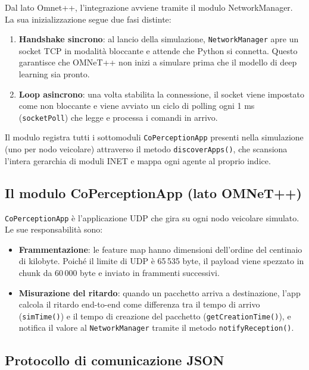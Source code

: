 \documentclass[12pt,a4paper]{article}
\begin{document}
Dal lato Omnet++, l'integrazione avviene tramite il modulo NetworkManager. La sua inizializzazione
segue due fasi distinte:

\begin{enumerate}
  \item \textbf{Handshake sincrono}: al lancio della simulazione, \texttt{NetworkManager} apre
        un socket TCP in modalit\`a bloccante e attende che Python si connetta. Questo garantisce
        che OMNeT++ non inizi a simulare prima che il modello di deep learning sia pronto.

  \item \textbf{Loop asincrono}: una volta stabilita la connessione, il socket viene impostato
        come non bloccante e viene avviato un ciclo di polling ogni 1 ms (\texttt{socketPoll})
        che legge e processa i comandi in arrivo.
\end{enumerate}

Il modulo registra tutti i sottomoduli \texttt{CoPerceptionApp} presenti nella simulazione
(uno per nodo veicolare) attraverso il metodo \texttt{discoverApps()}, che scansiona l'intera
gerarchia di moduli INET e mappa ogni agente al proprio indice.

\subsection{Il modulo CoPerceptionApp (lato OMNeT++)}

\texttt{CoPerceptionApp} \`e l'applicazione UDP che gira su ogni nodo veicolare simulato.
Le sue responsabilit\`a sono:

\begin{itemize}
  \item \textbf{Frammentazione}: le feature map hanno dimensioni dell'ordine del centinaio di
        kilobyte. Poich\'e il limite di UDP \`e 65\,535 byte, il payload viene spezzato in
        chunk da 60\,000 byte e inviato in frammenti successivi.
  \item \textbf{Misurazione del ritardo}: quando un pacchetto arriva a destinazione, l'app
        calcola il ritardo end-to-end come differenza tra il tempo di arrivo (\texttt{simTime()})
        e il tempo di creazione del pacchetto (\texttt{getCreationTime()}), e notifica il valore
        al \texttt{NetworkManager} tramite il metodo \texttt{notifyReception()}.
\end{itemize}

\subsection{Protocollo di comunicazione JSON}
\end{document}
